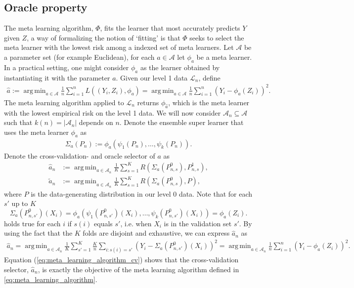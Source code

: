 \documentclass[11pt, a4paper]{article}
\DeclareMathOperator*{\argmin}{arg\,min}
\theoremstyle{definition}
\theoremstyle{remark}
\newcommand{\ml}{k}
\newcommand{\la}{\psi}
\newcommand{\lone}{\mathcal{L}}
\newcommand{\meta}{\phi}
\newcommand{\Meta}{\Phi}
\newcommand{\esl}{\Sigma}
\begin{document}
\subsection{Oracle property}
The meta learning algorithm, $ \Meta $, fits the learner that most accurately predicts $ Y $ given $ Z $, a way of formalizing the notion of `fitting' is that $ \Meta $ seeks to select the meta learner with the lowest risk among a indexed set of meta learners. Let $ \mathcal{A} $ be a parameter set (for example Euclidean), for each $ a \in \mathcal{A} $ let $ \meta_{a} $ be a meta learner. In a practical setting, one might consider $ \meta_{a} $ as the learner obtained by instantiating it with the parameter $ a $. Given our level 1 data $ \lone_{n} $, define 
\begin{align} \label{eq:meta_learning_algorithm}
    \hat{a} := \argmin_{a \in \mathcal{A}} \frac{1}{n} \sum_{i = 1}^{n} L((Y_i, Z_i), \meta_{a}) = \argmin_{a \in \mathcal{A}} \frac{1}{n} \sum_{i = 1}^{n} (Y_i - \meta_{a}(Z_i))^2.
\end{align}
The meta learning algorithm applied to $ \lone_{n} $ returns $ \meta_{ \hat{a} } $, which is the meta learner with the lowest empirical risk on the level 1 data. We will now consider $ \mathcal{A}_n \subseteq \mathcal{A} $ such that $ \ml(n) = |\mathcal{A}_{n}| $ depends on $ n $. Denote the ensemble super learner that uses the meta learner $ \meta_{ a } $ as 
\begin{align*}
    \esl_{a}(P_{n}) := \meta_{a}(\la_1(P_{n}), \ldots, \la_k(P_{n})).
\end{align*}
Denote the cross-validation- and oracle selector of $ a $ as 
\begin{align*}
    \hat{a}_n &:= \argmin_{a \in \mathcal{A}_{n}} \frac{1}{K} \sum_{s = 1}^{K} R(\esl_{a}(P_{n, s}^{0}), P_{n, s}^{1}), \\
    \tilde{a}_n &:= \argmin_{a \in \mathcal{A}_n} \frac{1}{K} \sum_{s = 1}^{K} R(\esl_{a}(P_{n, s}^{0}) , P),
\end{align*}
where $ P $ is the data-generating distribution in our level 0 data. Note that for each $ s' $ up to $ K $ 
$$ \esl_a(P_{n, s'}^{0})(X_i) = \meta_{a}(\la_{1}(P_{n, s'}^{0})(X_i) , \dots , \la_{\ml}(P_{n, s'}^{0})(X_i) ) = \meta_{a}(Z_i). $$ 
holds true for each $ i $ if $ s(i)$ equals $ s' $, i.e. when $ X_i $ is in the validation set $ s' $. By using the fact that the $ K $ folds are disjoint and exhaustive, we can express $ \hat{a}_n $ as  
\begin{align} \label{eq:meta_learning_algorithm_cv}
    \hat{a}_n = \argmin_{a \in \mathcal{A}_n} \frac{1}{K} \sum_{s' = 1}^{K} \frac{K}{n} \sum_{i: s(i) = s'} (Y_i - \esl_{a}(P_{n,s'}^{0}) (X_i))^2 = \argmin_{a \in \mathcal{A}_n} \frac{1}{n} \sum_{i = 1}^{n} (Y_i - \meta_{a}(Z_i))^2.
\end{align}
Equation (\ref{eq:meta_learning_algorithm_cv}) shows that the cross-validation selector, $ \hat{a}_n $, is exactly the objective of the meta learning algorithm defined in \eqref{eq:meta_learning_algorithm}. 
\end{document}
